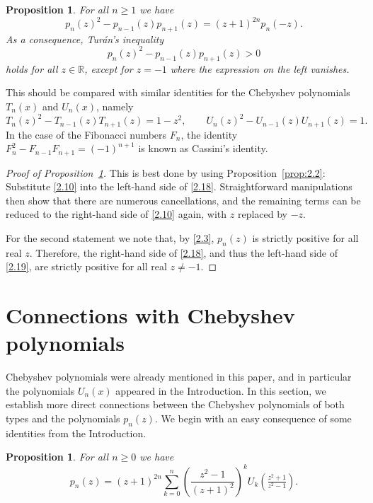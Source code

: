 \documentclass{amsart}
\theoremstyle{plain}
\newtheorem{proposition}[theorem]{Proposition}
\numberwithin{equation}{section}
\begin{document}
\begin{proposition}\label{prop:2.4}
For all $n\geq 1$ we have
\begin{equation}\label{2.18}
p_n(z)^2-p_{n-1}(z)p_{n+1}(z) = (z+1)^{2n}p_n(-z).
\end{equation}
As a consequence, Tur\'an's inequality
\begin{equation}\label{2.19}
p_n(z)^2-p_{n-1}(z)p_{n+1}(z) > 0
\end{equation}
holds for all $z\in\mathbb{R}$, except for $z=-1$ where the expression on the
left vanishes.
\end{proposition}

This should be compared with similar identities for the Chebyshev polynomials
$T_n(x)$ and $U_n(x)$, namely
\[
T_n(z)^2-T_{n-1}(z)T_{n+1}(z) = 1-z^2,\qquad
U_n(z)^2-U_{n-1}(z)U_{n+1}(z) = 1.
\]
In the case of the Fibonacci numbers $F_n$, the identity
$F_n^2-F_{n-1}F_{n+1}=(-1)^{n+1}$ is known as Cassini's identity.

\begin{proof}[Proof of Proposition~\ref{prop:2.4}]
This is best done by using Proposition~\ref{prop:2.2}: Substitute \eqref{2.10}
into the left-hand side of \eqref{2.18}. Straightforward manipulations then
show that there are numerous cancellations, and the remaining terms can be
reduced to the right-hand side of \eqref{2.10} again, with $z$ replaced by $-z$.

For the second statement we note that, by \eqref{2.3}, $p_n(z)$ is strictly
positive for all real $z$. Therefore, the right-hand side of \eqref{2.18},
and thus the left-hand side of \eqref{2.19}, are strictly positive for all
real $z\neq -1$.
\end{proof}


\section{Connections with Chebyshev polynomials}\label{sec:3}

Chebyshev polynomials were already mentioned in this paper, and in particular
the polynomials $U_n(x)$ appeared in the Introduction. In this section,
we establish more direct connections between the Chebyshev polynomials of
both types and the polynomials $p_n(z)$. We begin with an easy consequence of
some identities from the Introduction.

\begin{proposition}\label{prop:3.1}
For all $n\geq 0$ we have
\begin{equation}\label{3.1}
p_n(z) = (z+1)^{2n}\sum_{k=0}^n\left(\frac{z^2-1}{(z+1)^2}\right)^k
U_k(\tfrac{z^2+1}{z^2-1}).
\end{equation}
\end{proposition}
\end{document}
